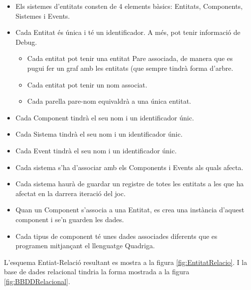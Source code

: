\begin{itemize}
  \item Els sistemes d'entitats consten de 4 elements bàsics: Entitats, Components, Sistemes i Events.
  
  \item Cada Entitat és única i té un identificador. A més, pot tenir informació de Debug.
    \begin{itemize}
      \item Cada entitat pot tenir una entitat Pare associada, de manera que es pugui fer un graf amb les entitats (que sempre tindrà forma d'arbre.
      \item Cada entitat pot tenir un nom associat.
      \item Cada parella pare-nom equivaldrà a una única entitat.
    \end{itemize}
  \item Cada Component tindrà el seu nom i un identificador únic.
  
  \item Cada Sistema tindrà el seu nom i un identificador únic.
  
  \item Cada Event tindrà el seu nom i un identificador únic.
  
  \item Cada sistema s'ha d'associar amb els Components i Events als quals afecta.
  
  \item Cada sistema haurà de guardar un registre de totes les entitats a les que ha afectat en la darrera iteració del joc.
  
  \item Quan un Component s'associa a una Entitat, es crea una instància d'aquest component i se'n guarden les dades.
  
  \item Cada tipus de component té unes dades associades diferents que es programen mitjançant el llenguatge Quadriga.
\end{itemize}

L'esquema Entiat-Relació resultant es mostra a la figura \ref{fig:EntitatRelacio}. I la base de dades relacional tindria la forma mostrada a la figura \ref{fig:BBDDRelacional}.

